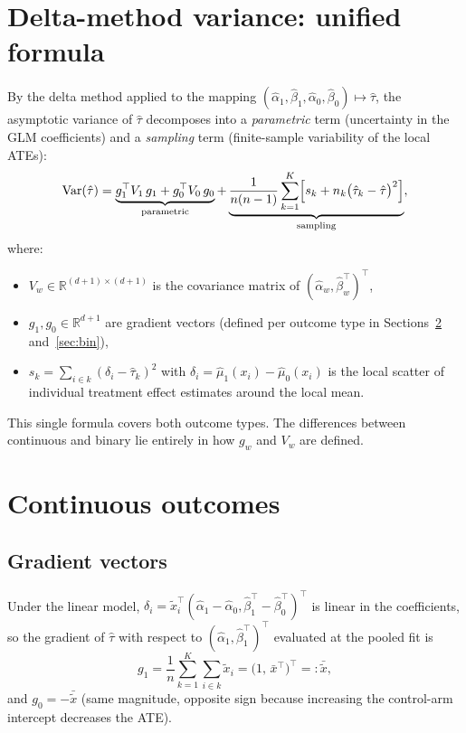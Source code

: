\documentclass[11pt, a4paper]{article}
\newcommand{\Var}{\mathrm{Var}}
\newcommand{\R}{\mathbb{R}}
\newcommand{\xt}{\tilde{x}}
\newcommand{\hbeta}{\hat{\beta}}
\newcommand{\halpha}{\hat{\alpha}}
\newcommand{\htau}{\hat{\tau}}
\begin{document}
\section{Delta-method variance: unified formula}

By the delta method applied to the mapping
$(\halpha_1,\hbeta_1,\halpha_0,\hbeta_0) \mapsto \htau$,
the asymptotic variance of $\htau$ decomposes into a
\emph{parametric} term (uncertainty in the GLM coefficients) and a
\emph{sampling} term (finite-sample variability of the local ATEs):
\begin{equation}\label{eq:var}
  \Var(\htau)
    = \underbrace{g_1^\top V_1\, g_1 + g_0^\top V_0\, g_0}_{\text{parametric}}
    + \underbrace{\frac{1}{n(n-1)}\sum_{k=1}^K\Bigl[
        s_k + n_k\bigl(\htau_k - \htau\bigr)^2\Bigr]}_{\text{sampling}},
\end{equation}
where:
\begin{itemize}
  \item $V_w \in \R^{(d+1)\times(d+1)}$ is the covariance matrix of
        $(\halpha_w,\hbeta_w^\top)^\top$,
  \item $g_1, g_0 \in \R^{d+1}$ are gradient vectors (defined per outcome type
        in Sections~\ref{sec:cont} and~\ref{sec:bin}),
  \item $s_k = \sum_{i \in k}(\delta_i - \htau_k)^2$ with
        $\delta_i = \hat\mu_1(x_i) - \hat\mu_0(x_i)$ is the local scatter of
        individual treatment effect estimates around the local mean.
\end{itemize}

This single formula covers both outcome types.  The differences between
continuous and binary lie entirely in how $g_w$ and $V_w$ are defined.

\section{Continuous outcomes}\label{sec:cont}

\subsection{Gradient vectors}

Under the linear model, $\delta_i = \xt_i^\top(\halpha_1-\halpha_0,\hbeta_1^\top-\hbeta_0^\top)^\top$
is linear in the coefficients, so the gradient of $\htau$ with respect to
$(\halpha_1,\hbeta_1^\top)^\top$ evaluated at the pooled fit is
\begin{equation}
  g_1 = \frac{1}{n}\sum_{k=1}^K\sum_{i \in k}\xt_i
       = \bigl(1,\, \bar{x}^\top\bigr)^\top =: \bar{\xt},
\end{equation}
and $g_0 = -\bar{\xt}$ (same magnitude, opposite sign because increasing the
control-arm intercept decreases the ATE).
\end{document}
